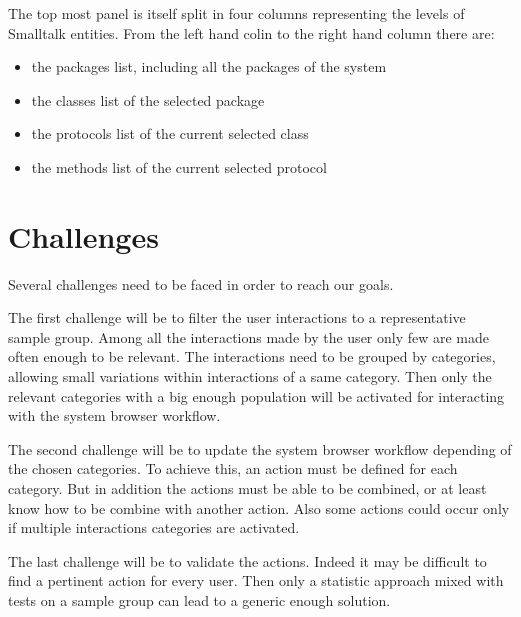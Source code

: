\documentclass[12pt]{article}
\begin{document}
The top most panel is itself split in four columns representing the levels of Smalltalk entities.
From the left hand colin to the right hand column there are:
\begin{itemize}
	\item the packages list, including all the packages of the system
	\item the classes list of the selected package
	\item the protocols list of the current selected class
	\item the methods list of the current selected protocol
\end{itemize}


\section{Challenges}

Several challenges need to be faced in order to reach our goals.

The first challenge will be to filter the user interactions to a representative sample group. 
Among all the interactions made by the user only few are made often enough to be relevant.
The interactions need to be grouped by categories, allowing small variations within interactions of a same category.
Then only the relevant categories with a big enough population will be activated for interacting with the system browser workflow.

The second challenge will be to update the system browser workflow depending of the chosen categories.
To achieve this, an action must be defined for each category.
But in addition the actions must be able to be combined, or at least know how to be combine with another action.
Also some actions could occur only if multiple interactions categories are activated.

The last challenge will be to validate the actions.
Indeed it may be difficult to find a pertinent action for every user.
Then only a statistic approach mixed with tests on a sample group can lead to a generic enough solution.
\end{document}
